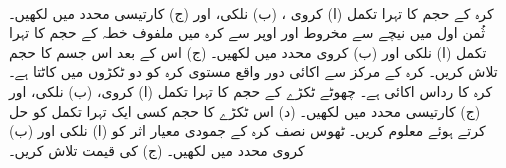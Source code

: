\\
کرہ  کے حجم کا تہرا تکمل (ا) کروی ، (ب) نلکی، اور (ج) کارتیسی محدد میں لکھیں۔
ثُمن اول میں نیچے سے مخروط  اور اوپر سے کرہ  میں ملفوف خطہ  کے حجم کا تہرا تکمل (ا) نلکی اور  (ب) کروی محدد میں لکھیں۔ (ج)  اس کے بعد اس جسم کا حجم تلاش کریں۔
کرہ کے مرکز سے  اکائی دور واقع  مستوی  کرہ  کو دو ٹکڑوں میں کاٹتا ہے۔کرہ   کا رداس  اکائی     ہے۔  چھوٹے ٹکڑے  کے حجم کا تہرا تکمل (ا) کروی، (ب) نلکی، اور (ج) کارتیسی محدد میں لکھیں۔ (د) اس ٹکڑے کا حجم کسی ایک تہرا تکمل کو حل کرتے ہوئے   معلوم کریں۔
ٹھوس نصف کرہ  کے جمودی معیار اثر  کو (ا) نلکی اور (ب) کروی محدد میں لکھیں۔ (ج)  کی قیمت تلاش کریں۔

